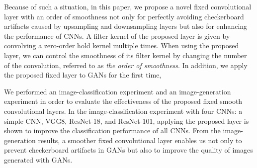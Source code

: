 \documentclass{article}
\newcounter{num}
\begin{document}
  Because of such a situation,
  in this paper,
  we propose a novel fixed convolutional layer with an order of smoothness
  not only for perfectly avoiding checkerboard artifacts caused
  by upsampling and downsampling layers
  but also for enhancing the performance of CNNs.
  A filter kernel of the proposed layer is given by convolving a zero-order hold kernel
  multiple times.
  When using the proposed layer,
  we can control the smoothness of its filter kernel by changing
  the number of the convolution, referred to as \textit{the order of smoothness}.
  In addition, we apply the proposed fixed layer to GANs for the first time,

  We performed an image-classification experiment and an image-generation experiment
  in order to evaluate the effectiveness of the proposed fixed smooth convolutional layers.
  In the image-classification experiment with four CNNs:
  a simple CNN, VGG8, ResNet-18, and ResNet-101,
  applying the proposed layer is shown to improve the classification performance
  of all CNNs.
  From the image-generation results,
  a smoother fixed convolutional layer enables us not only
  to prevent checkerboard artifacts in GANs
  but also to improve the quality of images generated with GANs.
\end{document}
